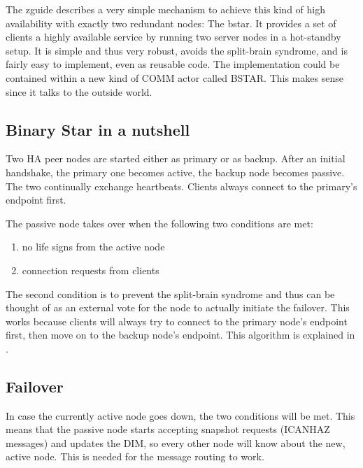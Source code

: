The \gls{zguide} describes a very simple mechanism to achieve this kind of high
availability with exactly two redundant nodes: The \gls{bstar}. It
provides a set of clients a highly available service by running two server
nodes in a hot-standby setup. It is simple and thus very robust, avoids the
split-brain syndrome, and is fairly easy to implement, even as reusable
code. The implementation could be contained within a new kind of COMM actor
called BSTAR. This makes sense since it talks to the outside world.


\subsection{Binary Star in a nutshell}
Two HA peer nodes are started either as primary or as backup. After an initial
handshake, the primary one becomes active, the backup node becomes passive. The
two continually exchange heartbeats. Clients always connect to the primary's endpoint first.

The passive node takes over when the following two conditions are met:

\begin{enumerate}
\item no life signs from the active node
\item connection requests from clients
\end{enumerate}

The second condition is to prevent the split-brain syndrome and thus can be
thought of as an external vote for the node to actually initiate the failover.
This works because clients will always try to connect to the primary node's
endpoint first, then move on to the backup node's endpoint. This algorithm is
explained in \cite[Chapter 4 - Reliable Request-Reply Patterns, Client-Side
Reliability (Lazy Pirate Pattern)]{zmq:zguide}.

\subsection{Failover}
In case the currently active node goes down, the two conditions will be met.
This means that the passive node starts accepting snapshot requests (ICANHAZ
messages) and updates the DIM, so every other node will know about the new,
active node. This is needed for the message routing to work.

